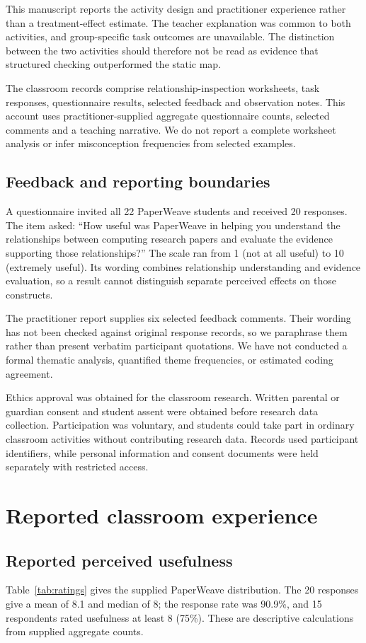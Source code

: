 This manuscript reports the activity design and practitioner experience rather than a treatment-effect estimate. The teacher explanation was common to both activities, and group-specific task outcomes are unavailable. The distinction between the two activities should therefore not be read as evidence that structured checking outperformed the static map.

The classroom records comprise relationship-inspection worksheets, task responses, questionnaire results, selected feedback and observation notes. This account uses practitioner-supplied aggregate questionnaire counts, selected comments and a teaching narrative. We do not report a complete worksheet analysis or infer misconception frequencies from selected examples.

\subsection{Feedback and reporting boundaries}
A questionnaire invited all 22 PaperWeave students and received 20 responses. The item asked: ``How useful was PaperWeave in helping you understand the relationships between computing research papers and evaluate the evidence supporting those relationships?'' The scale ran from 1 (not at all useful) to 10 (extremely useful). Its wording combines relationship understanding and evidence evaluation, so a result cannot distinguish separate perceived effects on those constructs.

The practitioner report supplies six selected feedback comments. Their wording has not been checked against original response records, so we paraphrase them rather than present verbatim participant quotations. We have not conducted a formal thematic analysis, quantified theme frequencies, or estimated coding agreement.

Ethics approval was obtained for the classroom research. Written parental or guardian consent and student assent were obtained before research data collection. Participation was voluntary, and students could take part in ordinary classroom activities without contributing research data. Records used participant identifiers, while personal information and consent documents were held separately with restricted access.

\section{Reported classroom experience}
\subsection{Reported perceived usefulness}
Table~\ref{tab:ratings} gives the supplied PaperWeave distribution. The 20 responses give a mean of 8.1 and median of 8; the response rate was 90.9\%, and 15 respondents rated usefulness at least 8 (75\%). These are descriptive calculations from supplied aggregate counts.

